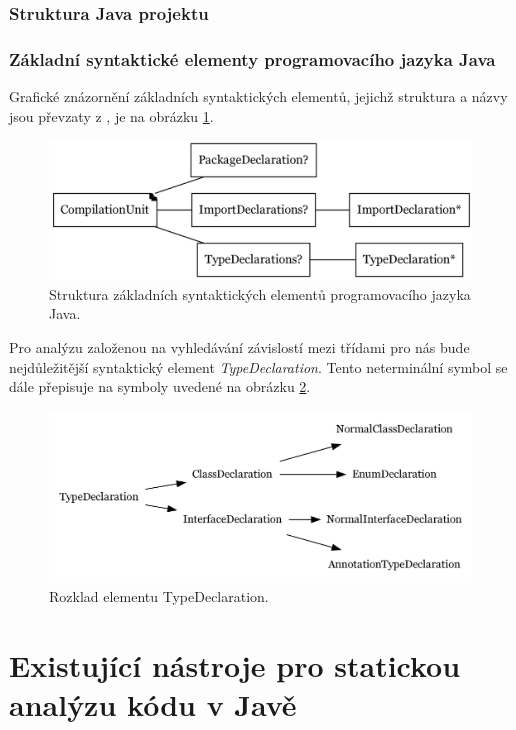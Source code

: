 \subsubsection{Struktura Java projektu}

\subsubsection{Základní syntaktické elementy programovacího jazyka Java}
Grafické znázornění základních syntaktických elementů, jejichž struktura a názvy jsou převzaty z \cite{Gosling:2005:JLS:1036643}, je na obrázku \ref{toplevel_elements}.
\begin{figure}[h!]
\centering
\includegraphics[width=\textwidth]{./graphs/java_top_elements.png}
\caption{Struktura základních syntaktických elementů programovacího jazyka Java.\label{toplevel_elements}}
\end{figure}

Pro analýzu založenou na vyhledávání závislostí mezi třídami pro nás bude nejdůležitější syntaktický element \emph{TypeDeclaration}. Tento neterminální symbol se dále přepisuje na symboly uvedené na obrázku \ref{type_declaration_options}.

\begin{figure}[h!]
\centering
\includegraphics[width=\textwidth]{./graphs/toplevel_types.png}
\caption{Rozklad elementu TypeDeclaration.\label{type_declaration_options}}
\end{figure}

\section{Existující nástroje pro statickou analýzu kódu v Javě}
